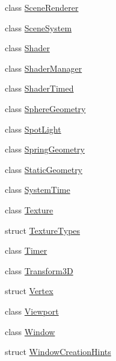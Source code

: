 \begin{DoxyCompactItemize}
class \mbox{\hyperlink{classec_1_1_scene_renderer}{Scene\+Renderer}}
\item 
class \mbox{\hyperlink{classec_1_1_scene_system}{Scene\+System}}
\item 
class \mbox{\hyperlink{classec_1_1_shader}{Shader}}
\item 
class \mbox{\hyperlink{classec_1_1_shader_manager}{Shader\+Manager}}
\item 
class \mbox{\hyperlink{classec_1_1_shader_timed}{Shader\+Timed}}
\item 
class \mbox{\hyperlink{classec_1_1_sphere_geometry}{Sphere\+Geometry}}
\item 
class \mbox{\hyperlink{classec_1_1_spot_light}{Spot\+Light}}
\item 
class \mbox{\hyperlink{classec_1_1_spring_geometry}{Spring\+Geometry}}
\item 
class \mbox{\hyperlink{classec_1_1_static_geometry}{Static\+Geometry}}
\item 
class \mbox{\hyperlink{classec_1_1_system_time}{System\+Time}}
\item 
class \mbox{\hyperlink{classec_1_1_texture}{Texture}}
\item 
struct \mbox{\hyperlink{structec_1_1_texture_types}{Texture\+Types}}
\item 
class \mbox{\hyperlink{classec_1_1_timer}{Timer}}
\item 
class \mbox{\hyperlink{classec_1_1_transform3_d}{Transform3D}}
\item 
struct \mbox{\hyperlink{structec_1_1_vertex}{Vertex}}
\item 
class \mbox{\hyperlink{classec_1_1_viewport}{Viewport}}
\item 
class \mbox{\hyperlink{classec_1_1_window}{Window}}
\item 
struct \mbox{\hyperlink{structec_1_1_window_creation_hints}{Window\+Creation\+Hints}}
\end{DoxyCompactItemize}
